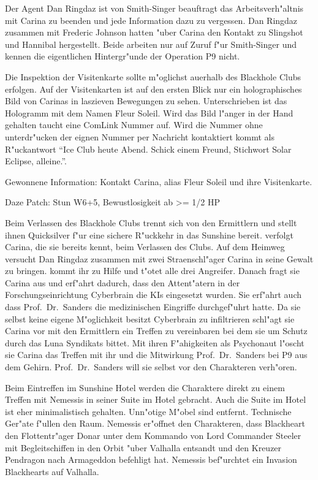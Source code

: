Der Agent {\emph{}Dan Ringdaz} ist von Smith-Singer beauftragt das Arbeitsverh"altnis mit Carina zu beenden und jede Information dazu zu vergessen. Dan Ringdaz zusammen mit Frederic Johnson hatten "uber Carina den Kontakt zu Slingshot und Hannibal hergestellt. Beide arbeiten nur auf Zuruf f"ur Smith-Singer und kennen die eigentlichen Hintergr"unde der Operation P9 nicht.

Die Inspektion der Visitenkarte sollte m"oglichst au\3erhalb des Blackhole Clubs erfolgen. Auf der Visitenkarten ist auf den ersten Blick nur ein holographisches Bild von Carinas in laszieven Bewegungen zu sehen. Unterschrieben ist das Hologramm mit dem Namen Fleur Soleil. Wird das Bild l"anger in der Hand gehalten taucht eine ComLink Nummer auf. Wird die Nummer ohne unterdr"ucken der eignen Nummer per Nachricht kontaktiert kommt als R"uckantwort "`Ice Club heute Abend. Schick einem Freund, Stichwort Solar Eclipse, alleine."'.

\begin{remarks}
	Gewonnene Information: Kontakt Carina, alias Fleur Soleil und ihre Visitenkarte.

	Daze Patch: Stun W6+5, Bewustlosigkeit ab >= 1/2 HP
\end{remarks}



Beim Verlassen des Blackhole Clubs trennt sich \xl{} von den Ermittlern und stellt ihnen Quicksilver f"ur eine sichere R"uckkehr in das Sunshine bereit. \xl{} verfolgt Carina, die sie bereits kennt, beim Verlassen des Clubs. Auf dem Heimweg versucht Dan Ringdaz zusammen mit zwei Stra\3enschl"ager Carina in seine Gewalt zu bringen. \xl{} kommt ihr zu Hilfe und t"otet alle drei Angreifer. Danach fragt sie Carina aus und erf"ahrt dadurch, dass den Attent"atern in der Forschungseinrichtung Cyberbrain die KIs eingesetzt wurden. Sie erf"ahrt auch dass Prof.~Dr.~Sanders die medizinischen Eingriffe durchgef"uhrt hatte. Da sie selbst keine eigene M"oglichkeit besitzt Cyberbrain zu infiltrieren schl"agt sie Carina vor mit den Ermittlern ein Treffen zu vereinbaren bei dem sie um Schutz durch das Luna Syndikats bittet. Mit ihren F"ahigkeiten als Psychonaut l"oscht sie Carina das Treffen mit ihr und die Mitwirkung Prof.~Dr.~Sanders bei P9 aus dem Gehirn. Prof.~Dr.~Sanders will sie selbst vor den Charakteren verh"oren.

Beim Eintreffen im Sunshine Hotel werden die Charaktere direkt zu einem Treffen mit Nemessis in seiner Suite im Hotel gebracht. Auch die Suite im Hotel ist eher minimalistisch gehalten. Unn"otige M"obel sind entfernt. Technische Ger"ate f"ullen den Raum. Nemessis er"offnet den Charakteren, dass Blackheart den Flottentr"ager Donar unter dem Kommando von Lord Commander Steeler mit Begleitschiffen in den Orbit "uber Valhalla entsandt und den Kreuzer Pendragon nach Armageddon befehligt hat. Nemessis bef"urchtet ein Invasion Blackhearts auf Valhalla.


